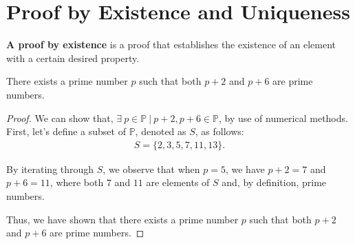\documentclass{report}
\begin{document}
    \section{\LARGE Proof by Existence and Uniqueness}
    \bigbreak \noindent 
    \smallbreak \noindent
    \begin{definition}
    \textbf{A proof by existence} is a proof that establishes the existence of an element with a certain desired property. 
\end{definition}
\bigbreak \noindent 
\begin{remark}
    There exists a prime number \(p\) such that both \(p+2\) and \(p+6\) are prime numbers.
\end{remark}
\bigbreak \noindent 
\begin{proof}
    We can show that, \(\exists\ p \in \mathbb{P}\ |\ p+2, p+6 \in \mathbb{P}\), by use of numerical methods. First, let's define a subset of \(\mathbb{P}\), denoted as \(S\), as follows:
    \begin{align*}
        S = \{2,3,5,7,11,13\}.
    \end{align*}
    \bigbreak \noindent 

    By iterating through \(S\), we observe that when \(p=5\), we have \(p+2 = 7\) and \(p+6 = 11\), where both \(7\) and \(11\) are elements of \(S\) and, by definition, prime numbers.
    \bigbreak \noindent 

    Thus, we have shown that there exists a prime number \(p\) such that both \(p+2\) and \(p+6\) are prime numbers.
    \bigbreak \noindent 
    \ep
\end{proof}
\end{document}

